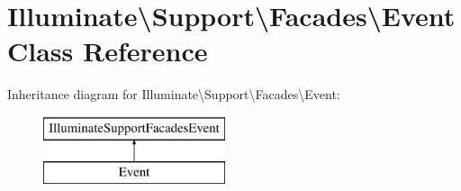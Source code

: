 \hypertarget{class_illuminate_1_1_support_1_1_facades_1_1_event}{}\section{Illuminate\textbackslash{}Support\textbackslash{}Facades\textbackslash{}Event Class Reference}
\label{class_illuminate_1_1_support_1_1_facades_1_1_event}
Inheritance diagram for Illuminate\textbackslash{}Support\textbackslash{}Facades\textbackslash{}Event\+:\begin{figure}[H]
\begin{center}
\leavevmode
\includegraphics[height=2.000000cm]{class_illuminate_1_1_support_1_1_facades_1_1_event}
\end{center}
\end{figure}

